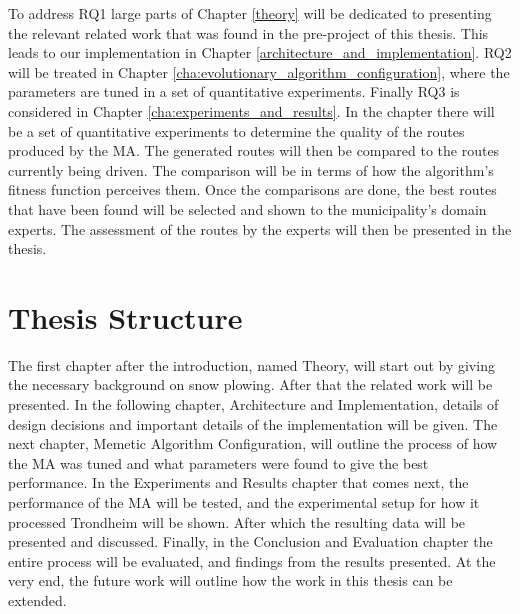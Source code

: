 To address RQ1 large parts of Chapter \ref{theory} will be dedicated to presenting the relevant related work that was found in the pre-project of this thesis. This leads to our implementation in Chapter \ref{architecture_and_implementation}. RQ2 will be treated in Chapter \ref{cha:evolutionary_algorithm_configuration}, where the parameters are tuned in a set of quantitative experiments. Finally RQ3 is considered in Chapter \ref{cha:experiments_and_results}. In the chapter there will be a set of quantitative experiments to determine the quality of the routes produced by the MA. The generated routes will then be compared to the routes currently being driven. The comparison will be in terms of how the algorithm's fitness function perceives them. Once the comparisons are done, the best routes that have been found will be selected and shown to the municipality's domain experts. The assessment of the routes by the experts will then be presented in the thesis.

\section{Thesis Structure}

The first chapter after the introduction, named Theory, will start out by giving the necessary background on snow plowing. After that the related work will be presented. In the following chapter, Architecture and Implementation, details of design decisions and important details of the implementation will be given. The next chapter, Memetic Algorithm Configuration, will outline the process of how the MA was tuned and what parameters were found to give the best performance. In the Experiments and Results chapter that comes next, the performance of the MA will be tested, and the experimental setup for how it processed Trondheim will be shown. After which the resulting data will be presented and discussed. Finally, in the Conclusion and Evaluation chapter the entire process will be evaluated, and findings from the results presented. At the very end, the future work will outline how the work in this thesis can be extended.

\cleardoublepage
